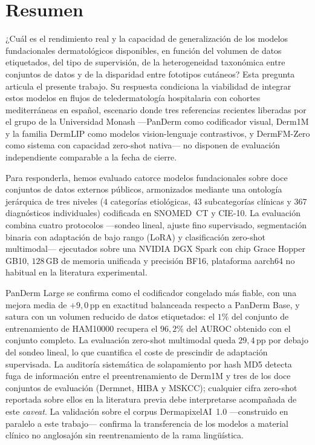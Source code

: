 
\chapter*{Resumen}

¿Cuál es el rendimiento real y la capacidad de generalización de los
modelos fundacionales dermatológicos disponibles, en función del
volumen de datos etiquetados, del tipo de supervisión, de la
heterogeneidad taxonómica entre conjuntos de datos y de la
disparidad entre fototipos cutáneos? Esta pregunta articula el
presente trabajo. Su respuesta condiciona la viabilidad de integrar
estos modelos en flujos de teledermatología hospitalaria con
cohortes mediterráneas en español, escenario donde tres referencias
recientes liberadas por el grupo de la Universidad Monash
---PanDerm como codificador visual, Derm1M y la familia DermLIP como
modelos vision-lenguaje contrastivos, y DermFM-Zero como sistema
con capacidad zero-shot nativa--- no disponen de evaluación
independiente comparable a la fecha de cierre.

Para responderla, hemos evaluado catorce modelos fundacionales sobre
doce conjuntos de datos externos públicos, armonizados mediante una
ontología jerárquica de tres niveles ($4$ categorías etiológicas,
$43$ subcategorías clínicas y $367$ diagnósticos individuales)
codificada en SNOMED~CT y CIE-10. La evaluación combina cuatro
protocolos ---sondeo lineal, ajuste fino supervisado, segmentación
binaria con adaptación de bajo rango (LoRA) y clasificación
zero-shot multimodal--- ejecutados sobre una NVIDIA DGX Spark con
chip Grace Hopper GB10, $128$\,GB de memoria unificada y precisión
BF16, plataforma aarch64 no habitual en la literatura experimental.

PanDerm Large se confirma como el codificador congelado más fiable,
con una mejora media de $+9{,}0$\,pp en exactitud balanceada
respecto a PanDerm Base, y satura con un volumen reducido de datos
etiquetados: el $1\%$ del conjunto de entrenamiento de HAM10000
recupera el $96{,}2\%$ del AUROC obtenido con el conjunto completo.
La evaluación zero-shot multimodal queda $29{,}4$\,pp por debajo del
sondeo lineal, lo que cuantifica el coste de prescindir de
adaptación supervisada. La auditoría sistemática de solapamiento por
hash MD5 detecta fuga de información entre el preentrenamiento de
Derm1M y tres de los doce conjuntos de evaluación (Dermnet, HIBA y
MSKCC); cualquier cifra zero-shot reportada sobre ellos en la
literatura previa debe interpretarse acompañada de este
\emph{caveat}. La validación sobre el corpus DermapixelAI~1.0
---construido en paralelo a este trabajo--- confirma la
transferencia de los modelos a material clínico no anglosajón sin
reentrenamiento de la rama lingüística.

